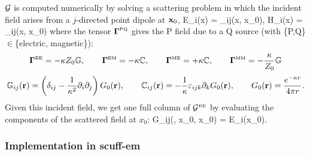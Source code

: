 \documentclass[letterpaper]{article}
\begin{document}
$\mathcal{G}$ is computed numerically by solving a scattering problem 
in which the incident field arises from a $j$-directed point dipole 
at $\mathbf{x}_0$,
{
   E_i(\vb x) = \Gamma{}_{ij}(\vb x, \vb x_0),
   \qquad 
   H_i(\vb x) = \Gamma{}_{ij}(\vb x, \vb x_0)
}
where the tensor $\boldsymbol{\Gamma}^{\hbox{\tiny{PQ}}}$ gives the P field due to
a Q source (with \{P,Q\}$\in$\{electric, magnetic\}):
$$ \boldsymbol{\Gamma}^{\hbox{\tiny{EE}}} = -\kappa Z_0 \mathbb{G}, \qquad 
   \boldsymbol{\Gamma}^{\hbox{\tiny{EM}}} = -\kappa     \mathbb{C}, \qquad 
   \boldsymbol{\Gamma}^{\hbox{\tiny{ME}}} = +\kappa     \mathbb{C}, \qquad 
   \boldsymbol{\Gamma}^{\hbox{\tiny{MM}}} = -\frac{\kappa}{Z_0} \mathbb{G}
$$
$$ \mathbb{G}_{ij}(\mathbf{r})=
   \left(\delta_{ij} - \frac{1}{\kappa^2}\partial_i \partial_j\right) G_0(\mathbf{r}),
   \qquad 
   \mathbb{C}_{ij}(\mathbf{r})=-\frac{1}{\kappa}\varepsilon_{ijk}\partial_k G_0(\mathbf{r}),
   \qquad
   G_0(\mathbf{r})=\frac{e^{-\kappa r}}{4\pi r}.
$$
Given this incident field, we get one full column of $\mathcal{G}^{\hbox{\tiny{EE}}}$ 
by evaluating the components of the scattered field at $x_0$:
{
 \mc G_{ij}(\xi, \vb x_0, \vb x_0) = E_i(\vb x_0).
}

\subsubsection*{Implementation in {\sc scuff-em}}
\end{document}
